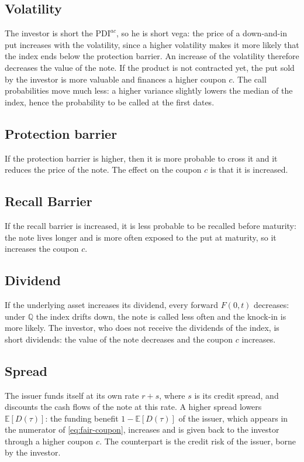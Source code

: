 \documentclass[11pt,a4paper]{article}
\newcommand{\E}{\mathbb{E}}
\newcommand{\Q}{\mathbb{Q}}
\begin{document}
\subsection*{Volatility}

The investor is short the $\mathrm{PDI}^{ac}$, so he is short vega: the price of a down-and-in put increases with the
volatility, since a higher volatility makes it more likely that the index ends below the protection barrier. An
increase of the volatility therefore decreases the value of the note. If the product is not contracted yet, the put
sold by the investor is more valuable and finances a higher coupon $c$. The call probabilities move much less: a
higher variance slightly lowers the median of the index, hence the probability to be called at the first dates.


\subsection*{Protection barrier}

If the protection barrier is higher, then it is more probable to cross it and it reduces the price of the note. The effect on the coupon $c$ is that it is increased.


\subsection*{Recall Barrier}


If the recall barrier is increased, it is less probable to be recalled before maturity: the note lives longer and is
more often exposed to the put at maturity, so it increases the coupon $c$.


\subsection*{Dividend}


If the underlying asset increases its dividend, every forward $F(0,t)$ decreases: under $\Q$ the index drifts down,
the note is called less often and the knock-in is more likely. The investor, who does not receive the dividends of
the index, is short dividends: the value of the note decreases and the coupon $c$ increases.


\subsection*{Spread}

The issuer funds itself at its own rate $r + s$, where $s$ is its credit spread, and discounts the cash flows of the
note at this rate. A higher spread lowers $\E[D(\tau)]$: the funding benefit $1 - \E[D(\tau)]$ of the issuer, which
appears in the numerator of \eqref{eq:fair-coupon}, increases and is given back to the investor through a higher
coupon $c$. The counterpart is the credit risk of the issuer, borne by the investor.
\end{document}
